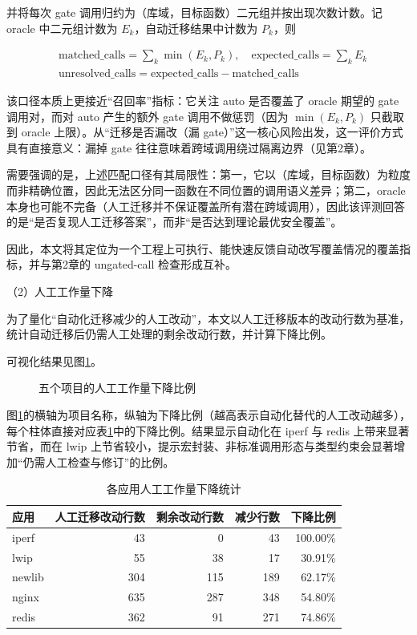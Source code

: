 \documentclass[UTF8,a4paper,12pt,twoside]{ctexart}  %
\begin{document}
并将每次 gate 调用归约为（库域，目标函数）二元组并按出现次数计数。记
oracle 中二元组计数为 \(E_k\)，自动迁移结果中计数为 \(P_k\)，则


\begin{equation}
\begin{aligned}
&\text{matched\_calls}=\sum_k \min(E_k, P_k),\quad
\text{expected\_calls}=\sum_k E_k \\
&\text{unresolved\_calls}=\text{expected\_calls}-\text{matched\_calls}
\end{aligned}
\end{equation}


该口径本质上更接近``召回率''指标：它关注 auto 是否覆盖了 oracle 期望的
gate 调用对，而对 auto 产生的额外 gate 调用不做惩罚（因为
\(\min(E_k,P_k)\) 只截取到 oracle 上限）。从``迁移是否漏改（漏
gate）''这一核心风险出发，这一评价方式具有直接意义：漏掉 gate
往往意味着跨域调用绕过隔离边界（见第2章）。

需要强调的是，上述匹配口径有其局限性：第一，它以（库域，目标函数）为粒度而非精确位置，因此无法区分同一函数在不同位置的调用语义差异；第二，oracle
本身也可能不完备（人工迁移并不保证覆盖所有潜在跨域调用），因此该评测回答的是``是否复现人工迁移答案''，而非``是否达到理论最优安全覆盖''。

因此，本文将其定位为一个工程上可执行、能快速反馈自动改写覆盖情况的覆盖指标，并与第2章的
ungated-call 检查形成互补。

（2）人工工作量下降

为了量化``自动化迁移减少的人工改动''，本文以人工迁移版本的改动行数为基准，统计自动迁移后仍需人工处理的剩余改动行数，并计算下降比例。

可视化结果见图\ref{fig:auto-manual-effort-reduction}。
\begin{figure}[h]
  \centering
  
  \caption{五个项目的人工工作量下降比例}
  \label{fig:auto-manual-effort-reduction}
\end{figure}

图\ref{fig:auto-manual-effort-reduction}的横轴为项目名称，纵轴为下降比例（越高表示自动化替代的人工改动越多），每个柱体直接对应表\ref{tab:manual-effort-reduction-by-app}中的下降比例。结果显示自动化在 iperf 与 redis 上带来显著节省，而在 lwip 上节省较小，提示宏封装、非标准调用形态与类型约束会显著增加``仍需人工检查与修订''的比例。


{\small
\setlength{\tabcolsep}{4pt}
\begin{longtable}{@{}lrrrr@{}}
\caption{各应用人工工作量下降统计}\label{tab:manual-effort-reduction-by-app}\\
\toprule
应用 & 人工迁移改动行数 & 剩余改动行数 & 减少行数 & 下降比例 \\
\midrule
\endhead
\bottomrule
\endlastfoot
iperf & 43 & 0 & 43 & 100.00\% \\
lwip & 55 & 38 & 17 & 30.91\% \\
newlib & 304 & 115 & 189 & 62.17\% \\
nginx & 635 & 287 & 348 & 54.80\% \\
redis & 362 & 91 & 271 & 74.86\% \\
\end{longtable}
}
\end{document}
